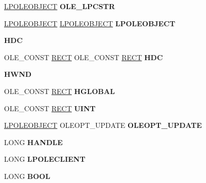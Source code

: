 \begin{DoxyCompactItemize}
\mbox{\label{struct___o_l_e_o_b_j_e_c_t_v_t_b_l_af08784d8647a9b387e193de9338f4410}} 
\hyperlink{struct___o_l_e_o_b_j_e_c_t}{L\+P\+O\+L\+E\+O\+B\+J\+E\+CT} {\bfseries O\+L\+E\+\_\+\+L\+P\+C\+S\+TR}
\item 
\mbox{\label{struct___o_l_e_o_b_j_e_c_t_v_t_b_l_a06d067b8ee16b9cfc7e303f70dbff2ce}} 
\hyperlink{struct___o_l_e_o_b_j_e_c_t}{L\+P\+O\+L\+E\+O\+B\+J\+E\+CT} \hyperlink{struct___o_l_e_o_b_j_e_c_t}{L\+P\+O\+L\+E\+O\+B\+J\+E\+CT} {\bfseries L\+P\+O\+L\+E\+O\+B\+J\+E\+CT}
\item 
\mbox{\label{struct___o_l_e_o_b_j_e_c_t_v_t_b_l_ad2e1af4c32a44b728eab09eadc6283f0}} 
{\bfseries H\+DC}
\item 
\mbox{\label{struct___o_l_e_o_b_j_e_c_t_v_t_b_l_a432c03d26d92ac268e89dbe838f0216f}} 
O\+L\+E\+\_\+\+C\+O\+N\+ST \hyperlink{structtag_r_e_c_t}{R\+E\+CT} O\+L\+E\+\_\+\+C\+O\+N\+ST \hyperlink{structtag_r_e_c_t}{R\+E\+CT} {\bfseries H\+DC}
\item 
\mbox{\label{struct___o_l_e_o_b_j_e_c_t_v_t_b_l_ae9da4846438c4ac43f1bf070d686c779}} 
{\bfseries H\+W\+ND}
\item 
\mbox{\label{struct___o_l_e_o_b_j_e_c_t_v_t_b_l_a93a0edb302c945bf45d7a4bd0fdcd34f}} 
O\+L\+E\+\_\+\+C\+O\+N\+ST \hyperlink{structtag_r_e_c_t}{R\+E\+CT} {\bfseries H\+G\+L\+O\+B\+AL}
\item 
\mbox{\label{struct___o_l_e_o_b_j_e_c_t_v_t_b_l_a44303d62a76231550e85b72abba498fa}} 
O\+L\+E\+\_\+\+C\+O\+N\+ST \hyperlink{structtag_r_e_c_t}{R\+E\+CT} {\bfseries U\+I\+NT}
\item 
\mbox{\label{struct___o_l_e_o_b_j_e_c_t_v_t_b_l_a3073f2b9f1b2ee8ec5edb17ab7ba5dbd}} 
\hyperlink{struct___o_l_e_o_b_j_e_c_t}{L\+P\+O\+L\+E\+O\+B\+J\+E\+CT} O\+L\+E\+O\+P\+T\+\_\+\+U\+P\+D\+A\+TE {\bfseries O\+L\+E\+O\+P\+T\+\_\+\+U\+P\+D\+A\+TE}
\item 
\mbox{\label{struct___o_l_e_o_b_j_e_c_t_v_t_b_l_ae63dddb30a2b8690ff25073a7d4aadb8}} 
L\+O\+NG {\bfseries H\+A\+N\+D\+LE}
\item 
\mbox{\label{struct___o_l_e_o_b_j_e_c_t_v_t_b_l_ac0ad3f1eea11afc0a483f74b02a47d30}} 
L\+O\+NG {\bfseries L\+P\+O\+L\+E\+C\+L\+I\+E\+NT}
\item 
\mbox{\label{struct___o_l_e_o_b_j_e_c_t_v_t_b_l_a7ff4a8b6902965baf3f6f83808fc37fc}} 
L\+O\+NG {\bfseries B\+O\+OL}
\end{DoxyCompactItemize}



